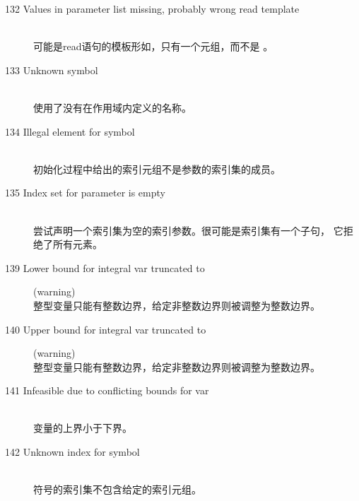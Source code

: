 \begin{description}
\item[132 Values in parameter list missing, probably wrong read
  template]\ \\
  可能是read语句的模板形如，只有一个元组，而不是
  。
\item[133 Unknown symbol ]\ \\
  使用了没有在作用域内定义的名称。
\item[134 Illegal element  for symbol]\ \\
  初始化过程中给出的索引元组不是参数的索引集的成员。
\item[135 Index set for parameter  is empty]\ \\
  尝试声明一个索引集为空的索引参数。很可能是索引集有一个子句，
  它拒绝了所有元素。
%
%
\item[139 Lower bound for integral var  truncated to ]
  (warning)\ \\
  整型变量只能有整数边界，给定非整数边界则被调整为整数边界。
\item[140 Upper bound for integral var  truncated to ]
  (warning)\ \\
  整型变量只能有整数边界，给定非整数边界则被调整为整数边界。
\item[141 Infeasible due to conflicting bounds for var ]\ \\
  变量的上界小于下界。
\item[142 Unknown index  for symbol ]\ \\
  符号的索引集不包含给定的索引元组。

\end{description}
